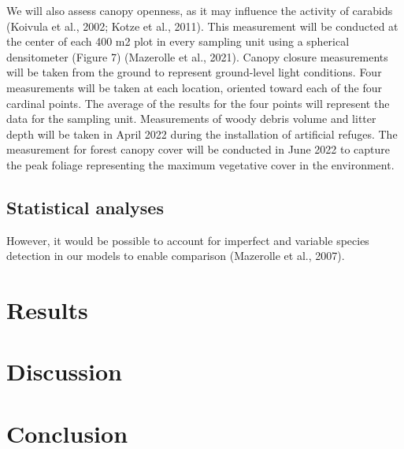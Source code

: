 We will also assess canopy openness, as it may influence the activity of carabids (Koivula et al., 2002; Kotze et al., 2011). 
This measurement will be conducted at the center of each 400 m2 plot in every sampling unit using a spherical densitometer (Figure 7) (Mazerolle et al., 2021). 
Canopy closure measurements will be taken from the ground to represent ground-level light conditions. 
Four measurements will be taken at each location, oriented toward each of the four cardinal points. 
The average of the results for the four points will represent the data for the sampling unit. 
Measurements of woody debris volume and litter depth will be taken in April 2022 during the installation of artificial refuges. 
The measurement for forest canopy cover will be conducted in June 2022 to capture the peak foliage representing the maximum vegetative cover in the environment.






\subsection*{Statistical analyses}
\label{subsec:analyses}
However, it would be possible to account for imperfect and variable species detection in our models to enable comparison (Mazerolle et al., 2007).

\clearpage

\section*{Results}
\label{sec:results1}

\clearpage

\section*{Discussion}
\label{sec:discu1}

\section*{Conclusion}
\label{sec:conclu1}

